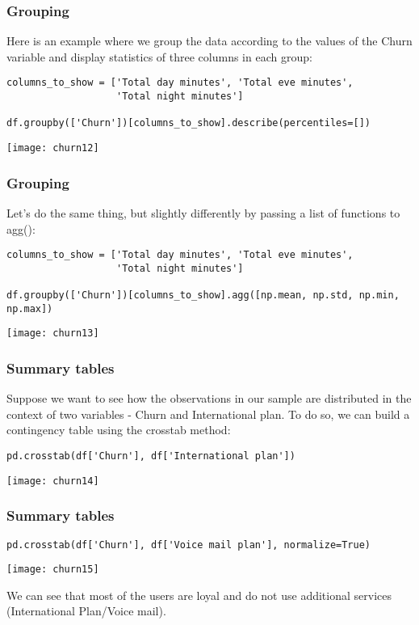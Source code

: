 \begin{frame}[fragile]\frametitle{Grouping}	
Here is an example where we group the data according to the values of the Churn variable and display statistics of three columns in each group:
\begin{lstlisting}
columns_to_show = ['Total day minutes', 'Total eve minutes', 
                   'Total night minutes']

df.groupby(['Churn'])[columns_to_show].describe(percentiles=[])
\end{lstlisting}
\begin{center}
\texttt{[image: churn12]}
\end{center}
\end{frame}


\begin{frame}[fragile]\frametitle{Grouping}	
Let's do the same thing, but slightly differently by passing a list of functions to agg():
\begin{lstlisting}
columns_to_show = ['Total day minutes', 'Total eve minutes', 
                   'Total night minutes']

df.groupby(['Churn'])[columns_to_show].agg([np.mean, np.std, np.min, np.max])
\end{lstlisting}
\begin{center}
\texttt{[image: churn13]}
\end{center}
\end{frame}

\begin{frame}[fragile]\frametitle{Summary tables}	
Suppose we want to see how the observations in our sample are distributed in the context of two variables - Churn and International plan. To do so, we can build a contingency table using the crosstab method:
\begin{lstlisting}
pd.crosstab(df['Churn'], df['International plan'])
\end{lstlisting}
\begin{center}
\texttt{[image: churn14]}
\end{center}
\end{frame}

\begin{frame}[fragile]\frametitle{Summary tables}	
\begin{lstlisting}
pd.crosstab(df['Churn'], df['Voice mail plan'], normalize=True)
\end{lstlisting}
\begin{center}
\texttt{[image: churn15]}
\end{center}
We can see that most of the users are loyal and do not use additional services (International Plan/Voice mail).
\end{frame}

